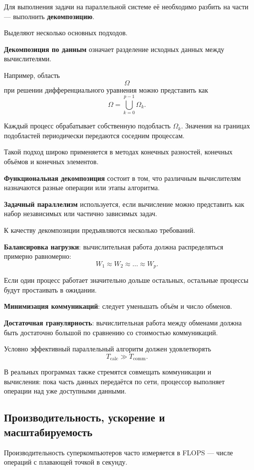 Для выполнения задачи на параллельной системе её необходимо разбить
на части --- выполнить \textbf{декомпозицию}.

Выделяют несколько основных подходов.

\textbf{Декомпозиция по данным} означает разделение исходных данных между
вычислителями.

Например, область
\[
\Omega
\]
при решении дифференциального уравнения можно представить как
\[
\Omega =
\bigcup_{k=0}^{p-1} \Omega_k.
\]

Каждый процесс обрабатывает собственную подобласть $\Omega_k$.
Значения на границах подобластей периодически передаются соседним процессам.

Такой подход широко применяется в методах конечных разностей,
конечных объёмов и конечных элементов.

\textbf{Функциональная декомпозиция} состоит в том, что различным вычислителям
назначаются разные операции или этапы алгоритма.

\textbf{Задачный параллелизм} используется, если вычисление можно представить
как набор независимых или частично зависимых задач.

К качеству декомпозиции предъявляются несколько требований.

\textbf{Балансировка нагрузки}: вычислительная работа должна распределяться
примерно равномерно:
\[
W_1 \approx W_2 \approx \ldots \approx W_p.
\]

Если один процесс работает значительно дольше остальных, остальные процессы
будут простаивать в ожидании.

\textbf{Минимизация коммуникаций}: следует уменьшать объём и число обменов.

\textbf{Достаточная гранулярность}: вычислительная работа между обменами должна
быть достаточно большой по сравнению со стоимостью коммуникаций.

Условно эффективный параллельный алгоритм должен удовлетворять
\[
T_{\mathrm{calc}} \gg T_{\mathrm{comm}}.
\]

В реальных программах также стремятся совмещать коммуникации и вычисления:
пока часть данных передаётся по сети, процессор выполняет операции над уже
доступными данными.

\subsection{Производительность, ускорение и масштабируемость}

Производительность суперкомпьютеров часто измеряется в FLOPS ---
числе операций с плавающей точкой в секунду.

